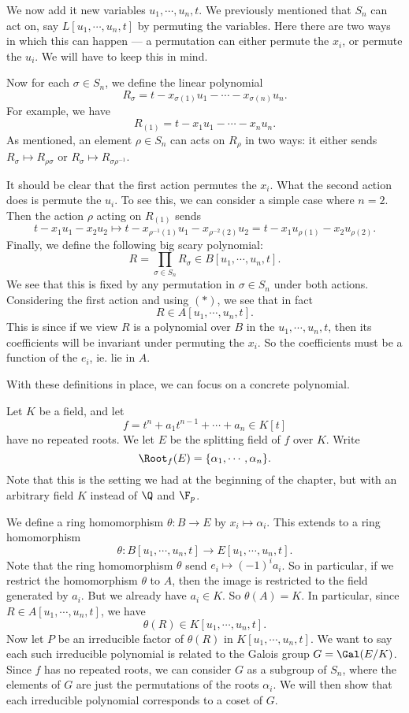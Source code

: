 \documentclass[a4paper]{article}
\begin{document}
We now add it new variables $u_1, \cdots, u_n, t$. We previously mentioned that $S_n$ can act on, say $L[u_1, \cdots, u_n, t]$ by permuting the variables. Here there are two ways in which this can happen --- a permutation can either permute the $x_i$, or permute the $u_i$. We will have to keep this in mind.

Now for each $\sigma \in S_n$, we define the linear polynomial
\[
  R_\sigma = t - x_{\sigma(1)} u_1 - \cdots - x_{\sigma(n)} u_n.
\]
For example, we have
\[
  R_{(1)} = t - x_1 u_1 - \cdots - x_n u_n.
\]
As mentioned, an element $\rho \in S_n$ can acts on $R_\rho$ in two ways: it either sends $R_\sigma \mapsto R_{\rho \sigma}$ or $R_\sigma \mapsto R_{\sigma\rho^{-1}}$.

It should be clear that the first action permutes the $x_i$. What the second action does is permute the $u_i$. To see this, we can consider a simple case where $n = 2$. Then the action $\rho$ acting on $R_{(1)}$ sends
\[
  t - x_1 u_1 - x_2 u_2 \mapsto t - x_{\rho^{-1}(1)} u_1 - x_{\rho^{-2}(2)} u_2 = t - x_1 u_{\rho(1)} - x_2 u_{\rho(2)}.
\]
Finally, we define the following big scary polynomial:
\[
  R = \prod_{\sigma \in S_n} R_\sigma \in B[u_1, \cdots, u_n, t].
\]
We see that this is fixed by any permutation in $\sigma \in S_n$ under both actions. Considering the first action and using $(*)$, we see that in fact
\[
  R \in A[u_1, \cdots, u_n, t].
\]
This is since if we view $R$ is a polynomial over $B$ in the $u_1, \cdots, u_n, t$, then its coefficients will be invariant under permuting the $x_i$. So the coefficients must be a function of the $e_i$, ie. lie in $A$.

With these definitions in place, we can focus on a concrete polynomial.

Let $K$ be a field, and let
\[
  f = t^n + a_1 t^{n - 1} + \cdots + a_n \in K[t]
\]
have no repeated roots. We let $E$ be the splitting field of $f$ over $K$. Write
\[
  \Root_f(E) = \{\alpha_1, \cdots, \alpha_n\}.
\]
Note that this is the setting we had at the beginning of the chapter, but with an arbitrary field $K$ instead of $\Q$ and $\F_p$.

We define a ring homomorphism $\theta: B \to E$ by $x_i \mapsto \alpha_i$. This extends to a ring homomorphism
\[
  \theta: B[u_1, \cdots, u_n, t] \to E[u_1, \cdots, u_n, t].
\]
Note that the ring homomorphism $\theta$ send $e_i \mapsto (-1)^i a_i$. So in particular, if we restrict the homomorphism $\theta$ to $A$, then the image is restricted to the field generated by $a_i$. But we already have $a_i \in K$. So $\theta(A) = K$. In particular, since $R \in A[u_1, \cdots, u_n, t]$, we have
\[
  \theta(R) \in K[u_1, \cdots, u_n, t].
\]
Now let $P$ be an irreducible factor of $\theta(R)$ in $K[u_1, \cdots, u_n, t]$. We want to say each such irreducible polynomial is related to the Galois group $G = \Gal(E/K)$. Since $f$ has no repeated roots, we can consider $G$ as a subgroup of $S_n$, where the elements of $G$ are just the permutations of the roots $\alpha_i$. We will then show that each irreducible polynomial corresponds to a coset of $G$.
\end{document}
